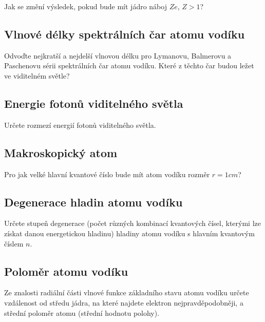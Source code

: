     Jak se změní výsledek, pokud bude mít jádro náboj $Ze$, $Z>1$?

\subsection{Vlnové délky spektrálních čar atomu vodíku}
    Odvoďte nejkratší a nejdelší vlnovou délku pro Lymanovu, Balmerovu a Paschenovu sérii spektrálních čar atomu vodíku. Které z těchto čar budou ležet ve viditelném světle?

\subsection{Energie fotonů viditelného světla}
    Určete rozmezí energií fotonů viditelného světla.

\subsection{Makroskopický atom}
    Pro jak velké hlavní kvantové číslo bude mít atom vodíku rozměr $r=1\unit{cm}$?

\subsection{Degenerace hladin atomu vodíku}
    Určete stupeň degenerace (počet různých kombinací kvantových čísel, kterými lze získat danou energetickou hladinu) hladiny atomu vodíku s hlavním kvantovým číslem $n$.

\subsection{Poloměr atomu vodíku}
    Ze znalosti radiální části vlnové funkce základního stavu atomu vodíku určete vzdálenost od středu jádra, na které najdete elektron nejpravděpodobněji, a střední poloměr atomu (střední hodnotu polohy).
